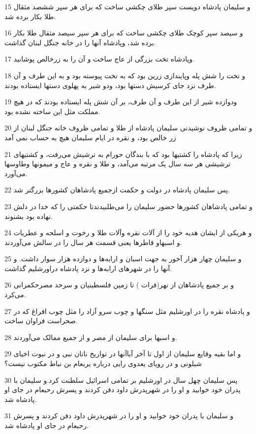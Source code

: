 \par 15 و سلیمان پادشاه دویست سپر طلای چکشی ساخت که برای هر سپر ششصد مثقال طلا بکار برده شد.
\par 16 و سیصد سپر کوچک طلای چکشی ساخت که برای هر سپر سیصد مثقال طلا بکار برده شد، وپادشاه آنها را در خانه جنگل لبنان گذاشت.
\par 17 وپادشاه تخت بزرگی از عاج ساخت و آن را به زرخالص پوشانید.
\par 18 و تخت را شش پله وپایندازی زرین بود که به تخت پیوسته بود و به این طرف و آن طرف نزد جای کرسیش دستها بود، ودو شیر به پهلوی دستها ایستاده بودند.
\par 19 ودوازده شیر از این طرف و آن طرف، بر آن شش پله ایستاده بودند که در هیچ مملکت مثل این ساخته نشده بود.
\par 20 و تمامی ظروف نوشیدنی سلیمان پادشاه از طلا و تمامی ظروف خانه جنگل لبنان از زر خالص بود، و نقره در ایام سلیمان هیچ به حساب نمی آمد
\par 21 زیرا که پادشاه را کشتیها بود که با بندگان حورام به ترشیش می‌رفت، و کشتیهای ترشیشی هر سه سال یک مرتبه می‌آمد، و طلا و نقره و عاج و میمونها وطاوسها می‌آورد.
\par 22 پس سلیمان پادشاه در دولت و حکمت ازجمیع پادشاهان کشورها بزرگتر شد.
\par 23 و تمامی پادشاهان کشورها حضور سلیمان را می‌طلبیدندتا حکمتی را که خدا در دلش نهاده بود بشنوند.
\par 24 و هریکی از ایشان هدیه خود را از آلات نقره وآلات طلا و رخوت و اسلحه و عطریات و اسبهاو قاطرها یعنی قسمت هر سال را در سالش می‌آوردند.
\par 25 و سلیمان چهار هزار آخور به جهت اسبان و ارابه‌ها و دوازده هزار سوار داشت. و آنها را در شهرهای ارابه‌ها و نزد پادشاه دراورشلیم گذاشت.
\par 26 و بر جمیع پادشاهان از نهر(فرات ) تا زمین فلسطینیان و سرحد مصرحکمرانی می‌کرد.
\par 27 و پادشاه نقره را در اورشلیم مثل سنگها و چوب سرو آزاد را مثل چوب افراغ که در صحراست فراوان ساخت.
\par 28 و اسبها برای سلیمان از مصر و از جمیع ممالک می‌آوردند.
\par 29 و اما بقیه وقایع سلیمان از اول تا آخر آیاآنها در تواریخ ناتان نبی و در نبوت اخیای شیلونی و در رویای یعدوی رایی درباره یربعام بن نباط مکتوب نیست؟
\par 30 پس سلیمان چهل سال در اورشلیم بر تمامی اسرائیل سلطنت کرد.و سلیمان با پدران خود خوابید و او را در شهرپدرش داود دفن کردند و پسرش رحبعام در جای او پادشاه شد.
\par 31 و سلیمان با پدران خود خوابید و او را در شهرپدرش داود دفن کردند و پسرش رحبعام در جای او پادشاه شد.
 
